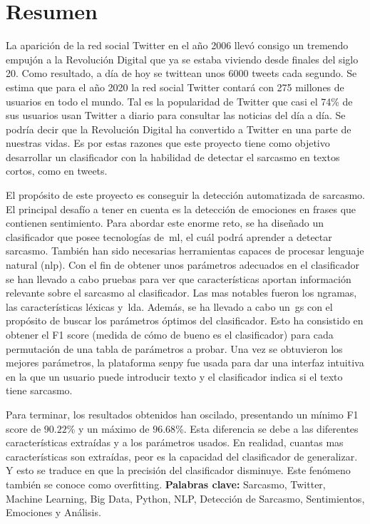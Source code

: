 \cleardoublepage
{}
\chapter*{Resumen}
 La aparición de la red social Twitter en el año 2006 llevó consigo un tremendo empujón a la Revolución Digital que ya se estaba viviendo desde finales del siglo 20. Como resultado, a día de hoy se twittean unos 6000 tweets cada segundo. Se estima que para el año 2020 la red social Twitter contará con 275 millones de usuarios en todo el mundo. Tal es la popularidad de Twitter que casi el 74\% de sus usuarios usan Twitter a diario para consultar las noticias del día a día. Se podría decir que la Revolución Digital ha convertido a Twitter en una parte de nuestras vidas. Es por estas razones que este proyecto tiene como objetivo desarrollar un clasificador con la habilidad de detectar el sarcasmo en textos cortos, como en tweets.\par
 El propósito de este proyecto es conseguir la detección automatizada de sarcasmo. El principal desafío a tener en cuenta es la detección de emociones en frases que contienen sentimiento. Para abordar este enorme reto, se ha diseñado un clasificador que posee tecnologías de~\ac{ml}, el cuál podrá aprender a detectar sarcasmo. También han sido necesarias herramientas capaces de procesar lenguaje natural (\ac{nlp}). Con el fin de obtener unos parámetros adecuados en el clasificador se han llevado a cabo pruebas para ver que características aportan información relevante sobre el sarcasmo al clasificador. Las mas notables fueron los ngramas, las características léxicas y~\ac{lda}. Además, se ha llevado a cabo un~\ac{gs} con el propósito de buscar los parámetros óptimos del clasificador. Esto ha consistido en obtener el F1 score (medida de cómo de bueno es el clasificador) para cada permutación de una tabla de parámetros a probar. Una vez se obtuvieron los mejores parámetros, la plataforma senpy fue usada para dar una interfaz intuitiva en la que un usuario puede introducir texto y el clasificador indica si el texto tiene sarcasmo.\par
 Para terminar, los resultados obtenidos han oscilado, presentando un mínimo F1 score de $90.22$\% y un máximo de $96.68$\%. Esta diferencia se debe a las diferentes características extraídas y a los parámetros usados. En realidad, cuantas mas características son extraídas, peor es la capacidad del clasificador de generalizar. Y esto se traduce en que la precisión del clasificador disminuye. Este fenómeno también se conoce como overfitting.
\vfill
\textbf{Palabras clave:} Sarcasmo, Twitter, Machine Learning, Big Data, Python, NLP, Detección de Sarcasmo, Sentimientos, Emociones y Análisis. 